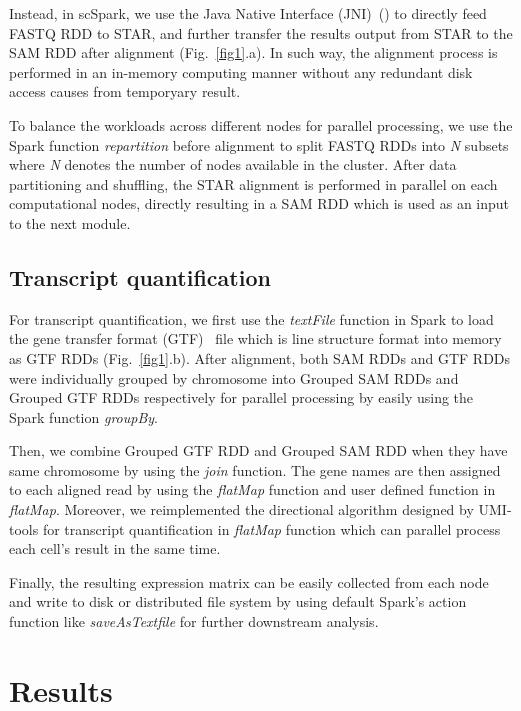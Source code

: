 \documentclass[conference]{IEEEtran}
\begin{document}
Instead, in scSpark, we use the Java Native Interface (JNI)~(\cite{kim2012benchmarking}) to directly feed FASTQ RDD to STAR, and further transfer the results output from STAR to the SAM RDD after alignment (Fig.~\ref{fig1}.a). 
In such way, the alignment process is performed in an in-memory computing manner without any redundant disk access causes from temporyary result. 

To balance the workloads across different nodes for parallel processing, we use the Spark function \textit{repartition} before alignment to split FASTQ RDDs into \textit{N} subsets where \textit{N} denotes the number of nodes available in the cluster.
After data partitioning and shuffling, the STAR alignment is performed in parallel on each computational nodes, directly resulting in a SAM RDD which is used as an input to the next module.

\subsection{Transcript quantification}
For transcript quantification, we first use the \textit{textFile} function in Spark to load the gene transfer format (GTF)~\cite{breese2013ngsutils} file which is line structure format into memory as GTF RDDs (Fig.~\ref{fig1}.b). 
After alignment, both SAM RDDs and GTF RDDs were individually grouped by chromosome into Grouped SAM RDDs and Grouped GTF RDDs respectively for parallel processing by easily using the Spark function \textit{groupBy}. 

Then, we combine Grouped GTF RDD and Grouped SAM RDD when they have same chromosome by using the \textit{join} function.
The gene names are then assigned to each aligned read by using the \textit{flatMap} function and user defined function in \textit{flatMap}. 
Moreover, we reimplemented the directional algorithm designed by UMI-tools for transcript quantification in \textit{flatMap} function which can parallel process each cell's result in the same time. 

Finally, the resulting expression matrix can be easily collected from each node and write to disk or distributed file system by using default Spark's action function like \textit{saveAsTextfile} for further downstream analysis. 

\section{Results}
\end{document}

